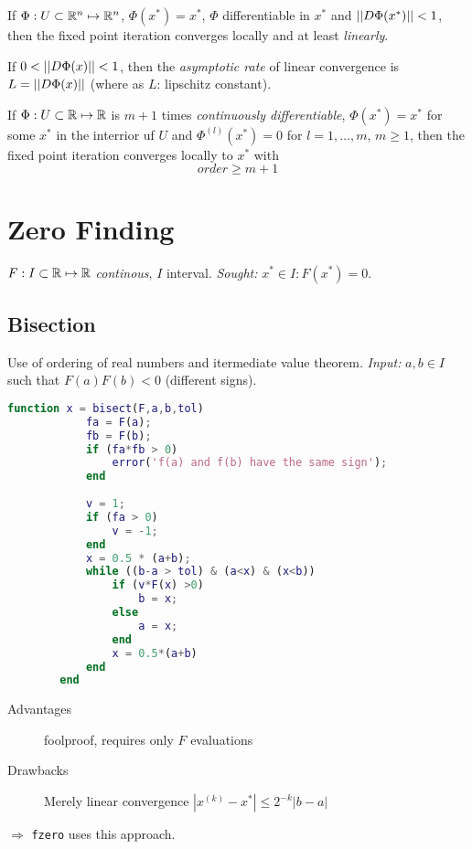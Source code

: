 		\begin{lemma}
		 If $\Phi: U \subset \mathbb{R}^n \mapsto \mathbb{R}^n$, $\Phi(x^*) = x^*$, $\Phi$ differentiable in $x^*$ and $\left|\left| D\Phi(x^*) \right|\right| < 1$, then the fixed point iteration converges locally and at least \emph{linearly}.
		\end{lemma}
		
		If $0 < \left|\left| D\Phi(x) \right|\right| < 1$, then the \emph{asymptotic rate} of linear convergence is $L = \left|\left| D\Phi(x) \right|\right|$ (where as $L$: lipschitz constant).
		
		\begin{lemma}
		 If $\Phi: U \subset \mathbb{R} \mapsto \mathbb{R}$ is $m+1$ times \emph{continuously differentiable}, $\Phi(x^*) = x^*$ for some $x^*$ in the interrior uf $U$ and $\Phi^{(l)}(x^*) = 0$ for $l=1, \ldots, m$, $m \geq 1$, then the fixed point iteration converges locally to $x^*$ with 
		 \[order \geq m+1 \]
		\end{lemma}

\section{Zero Finding}
	$F: I \subset \mathbb{R} \mapsto \mathbb{R}$ \emph{continous}, $I$ interval. \emph{Sought:} $x^* \in I: F(x^*) = 0$.
	\subsection{Bisection}
		Use of ordering of real numbers and itermediate value theorem.
		\emph{Input:} $a,b \in I$ such that $F(a)F(b) < 0$ (different signs).
		\begin{lstlisting}[language=matlab]
		 function x = bisect(F,a,b,tol)
			fa = F(a);
			fb = F(b);
			if (fa*fb > 0)
				error('f(a) and f(b) have the same sign');
			end
			
			v = 1;
			if (fa > 0)
				v = -1;
			end
			x = 0.5 * (a+b);
			while ((b-a > tol) & (a<x) & (x<b))
				if (v*F(x) >0)
					b = x;
				else
					a = x;
				end
				x = 0.5*(a+b)
			end
		end
		\end{lstlisting}
		\begin{description}
		 \item[Advantages] foolproof, requires only $F$ evaluations
		 \item[Drawbacks] Merely linear convergence \( |x^{(k)} - x^* | \leq 2^{-k} |b-a| \)
		\end{description}
		\( \Longrightarrow \) \verb|fzero| uses this approach.
